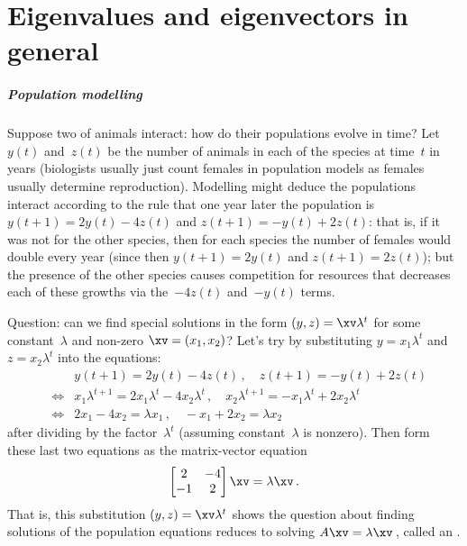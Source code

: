 
\chapter{Eigenvalues and eigenvectors in general}
\label{ch:gee}

\minitoc





\paragraph{Population modelling} 
Suppose two  of animals interact: how do their populations evolve in time?  
Let \(y(t)\) and~\(z(t)\) be the number of  animals in each of the species at time~\(t\) in years (biologists usually just count females in population models as females usually determine reproduction). 
Modelling might deduce the populations interact according to the rule that one year later the population is \(y(t+1)=2y(t)-4z(t)\) and \(z(t+1)=-y(t)+2z(t)\): that is, if it was not for the other species, then for each species the number of females would double every year (since then \(y(t+1)=2y(t)\) and \(z(t+1)=2z(t)\)); but the presence of the other species causes competition for resources that decreases each of these growths via the~\(-4z(t)\) and~\(-y(t)\) terms.  

Question: can we find special solutions in the form \((y,z)=\xv \lambda^{t}\) for some constant~\(\lambda\) and non-zero \(\xv=(x_1,x_2)\)?  
Let's try by substituting \(y=x_1\lambda^{t}\) and \(z=x_2\lambda^{t}\) into the  equations:
\begin{eqnarray*}
&&y(t+1)=2y(t)-4z(t)\,,\quad z(t+1)=-y(t)+2z(t)
\\&\iff& 
x_1 \lambda^{t+1}=2x_1\lambda^{t}-4x_2\lambda^{t}
\,,\quad
x_2 \lambda^{t+1}=-x_1\lambda^{t}+2x_2\lambda^{t}
\\&\iff& 2x_1-4x_2=\lambda x_1
\,,\quad
-x_1+2x_2=\lambda x_2
\end{eqnarray*}
after dividing by the factor~\(\lambda^{t}\) (assuming constant~\(\lambda\) is nonzero).
Then form these last two equations as the matrix-vector equation
\begin{equation*}
\begin{bmatrix} 2&-4\\-1&2 \end{bmatrix}\xv=\lambda\xv\,.
\end{equation*}
That is, this substitution \((y,z)=\xv \lambda^{t}\) shows the question about finding solutions of the population equations reduces to solving \(A\xv=\lambda \xv\)\,, called an .

